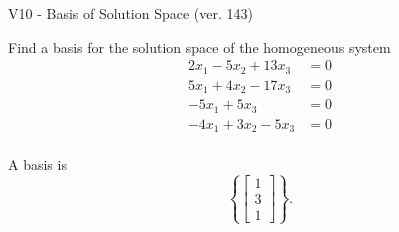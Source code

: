\begin{exercise}
  \begin{exerciseTitle}V10 - Basis of Solution Space (ver. 143)\end{exerciseTitle}
  \begin{exerciseStatement}
    Find a basis for the solution space of the homogeneous system 
\begin{align*}
 2 x_ 1 -5 x_ 2 + 13 x_ 3 &= 0  \\ 
  5 x_ 1 + 4 x_ 2 -17 x_ 3 &= 0  \\ 
  -5 x_ 1 + 5 x_ 3 &= 0  \\ 
  -4 x_ 1 + 3 x_ 2 -5 x_ 3 &= 0  \\ 
 \end{align*}


 
  \end{exerciseStatement}

  \begin{exerciseAnswer}
   A basis is   
\[\left\{\left[\begin{array}{c}
1 \\
3 \\
1
\end{array}\right]\right\}.\]

  


  \end{exerciseAnswer}
\end{exercise}